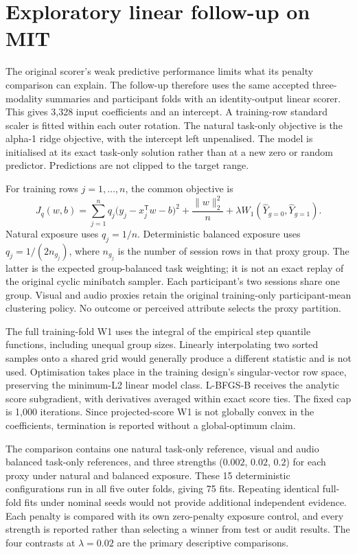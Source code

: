 \section{Exploratory linear follow-up on MIT}
\label{sec:linear-followup-method}

The original scorer's weak predictive performance limits what its penalty comparison can
explain. The follow-up therefore uses the same accepted three-modality summaries and
participant folds with an identity-output linear scorer. This gives 3,328 input coefficients
and an intercept. A training-row standard scaler is fitted within each outer rotation.
The natural task-only objective is the alpha-1 ridge objective, with the intercept left
unpenalised. The model is initialised at its exact task-only solution rather than at a new
zero or random predictor. Predictions are not clipped to the target range.

For training rows $j=1,\ldots,n$, the common objective is
\begin{equation}
 J_q(w,b)=\sum_{j=1}^{n}q_j\bigl(y_j-x_j^{\mathsf T}w-b\bigr)^2
       +\frac{\|w\|_2^2}{n}
       +\lambda W_1(\hat Y_{g=0},\hat Y_{g=1}).
\end{equation}
Natural exposure uses $q_j=1/n$. Deterministic balanced exposure uses
$q_j=1/(2n_{g_j})$, where $n_{g_j}$ is the number of session rows in that proxy group.
The latter is the expected group-balanced task weighting; it is not an exact replay of
the original cyclic minibatch sampler. Each participant's two sessions share one group.
Visual and audio proxies retain the original training-only participant-mean clustering
policy. No outcome or perceived attribute selects the proxy partition.

The full training-fold W1 uses the integral of the empirical step quantile functions,
including unequal group sizes. Linearly interpolating two sorted samples onto a shared grid
would generally produce a different statistic and is not used. Optimisation takes place in
the training design's singular-vector row space, preserving the minimum-L2 linear model
class. L-BFGS-B receives the analytic score subgradient, with derivatives averaged within
exact score ties. The fixed cap is 1,000 iterations. Since projected-score W1 is not globally
convex in the coefficients, termination is reported without a global-optimum claim.

The comparison contains one natural task-only reference, visual and audio balanced task-only
references, and three strengths ($0.002$, $0.02$, $0.2$) for each proxy under natural and
balanced exposure. These 15 deterministic configurations run in all five outer folds,
giving 75 fits. Repeating identical full-fold fits under nominal seeds would not provide
additional independent evidence. Each penalty is compared with its own zero-penalty exposure
control, and every strength is reported rather than selecting a winner from test or audit
results. The four contrasts at $\lambda=0.02$ are the primary descriptive comparisons.

